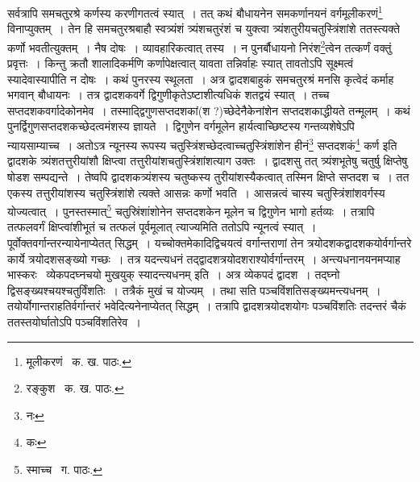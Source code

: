 \documentclass[11pt, openany]{book}
\begin{document}
{\noindent सर्वत्रापि समचतुरश्रे कर्णस्य करणीगतत्वं स्यात्~। तत् कथं बौधायनेन समकर्णानयनं वर्गमूलीकरणं\renewcommand{\thefootnote}{१}\footnote{मूलीकरणं \textendash\ क. ख. पाठः.} विनाप्युक्तम्~। तेन हि समचतुरश्रबाहौ स्वत्र्यंशं त्र्यंशचतुरंशं च युक्त्वा त्र्यंशतुरीयचतुस्त्रिंशांशे ततस्त्यक्ते कर्णो भवतीत्युक्तम्~। नैष दोषः~। व्यावहारिकत्वात् तस्य~। न पुनर्बौधायनो निरंश\renewcommand{\thefootnote}{२}\footnote{रङ्कुश \textendash\ क. ख. पाठः.}त्वेन तत्कर्णं वक्तुं प्रवृत्तः~। किन्तु क्रतौ शालादिकर्मणि कर्णापेक्षत्वात् यावता तन्निर्वाहः स्यात् तावतोऽपि सूक्ष्मत्वं
स्यादेवास्यापीति न दोषः~। कथं पुनरस्य स्थूलता~। अत्र द्वादशबाहुकं समचतुरश्रं मनसि कृत्वेदं कर्माह भगवान् बौधायनः~। तत्र द्वादशकवर्गे
द्विगुणीकृतेऽष्टाशीत्यधिकं शतद्वयं स्यात्~। तच्च सप्तदशकवर्गादेकोनमेव~। तस्माद्द्विगुणसप्तदशकां(श ?)च्छेदेनैकेनांशेन सप्तदशकाद्धीयते तन्मूलम्~। कथं पुनर्द्विगुणसप्तदशकच्छेदत्वमंशस्य ज्ञायते~। द्विगुणेन वर्गमूलेन हार्यत्वाच्छिष्टस्य गन्तव्यशेषेऽपि न्यायसाम्याच्च~। अतोऽत्र न्यूनस्य रूपस्य चतुस्त्रिंशच्छेदत्वाच्चतुस्त्रिंशांशेन हीनं\renewcommand{\thefootnote}{३}\footnote{नः} सप्तदशकं\renewcommand{\thefootnote}{४}\footnote{कः} कर्ण इति द्वादशके त्र्यंशतत्तुरीयांशौ क्षिप्त्वा तत्तुरीयांशचतुस्त्रिंशांशत्याग उक्तः~। द्वादशसु तत् त्र्यंशभूतेषु चतुर्षु क्षिप्तेषु षोडश सम्पद्यन्ते~। तेष्वपि द्वादशकत्र्यंशस्य चतुष्कस्य तुरीयांशस्यैकत्वात् तस्मिन क्षिप्ते सप्तदश च~। तत एकस्य तत्तुरीयांशस्य चतुस्त्रिंशांशे त्यक्ते आसन्नः कर्णो भवति~। आसन्नत्वं चास्य चतुस्त्रिंशांशवर्गस्य योज्यत्वात्~। पुनस्तस्मात्\renewcommand{\thefootnote}{५}\footnote{स्माच्च \textendash\ ग. पाठः.} चतुस्रिंशांशोनेन सप्तदशकेन मूलेन च द्विगुणेन भागो हर्तव्यः~। तत्रापि तत्फलवर्गं क्षिप्त्वांशीभूतं च तत्फलं पूर्वमूलात् त्याज्यमिति ततोऽपि न्यूनत्वं स्यात्~। पूर्वोक्तवर्गान्तरन्यायेनाप्येतत् सिद्धम्~। यच्चोक्तमेकादिद्विचयत्वं वर्गान्तराणां तेन त्रयोदशकद्वादशकयोर्वर्गान्तरे कार्ये त्रयोदशसङ्ख्यो गच्छः~। तत्र यदन्त्यधनं तद्द्वादशत्रयोदशराश्योर्वर्गान्तरम्~। अन्त्यधनानयनमप्याह भास्करः \textendash\ {\qt व्येकपदघ्नचयो मुखयुक् स्यादन्त्यधनम्} इति~। अत्र व्येकपदं द्वादश~। तद्घ्नो द्विसङ्ख्यश्चयश्चतुर्विंशतिः~। तत्रैकं मुखं च योज्यम्~। तथा सति पञ्चविंशतिसङ्ख्यमन्त्यधनम्~। {\qt तयोर्योगान्तराहतिर्वर्गान्तरं भवेदि}त्यनेनाप्येतत् सिद्धम्~। तत्रापि द्वादशत्रयोदशयोगः पञ्चविंशतिः तदन्तरं चैकं ततस्तयोर्घातोऽपि पञ्चविंशतिरेव~।

\newpage


}
\end{document}
